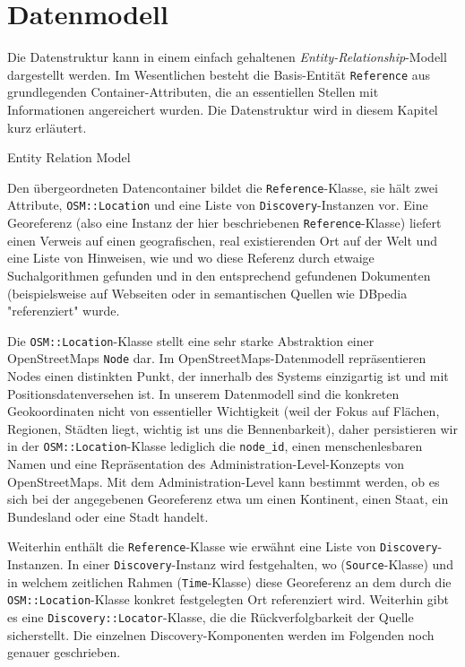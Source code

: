 \section{Datenmodell}
\label{datenmodell}

Die Datenstruktur kann in einem einfach gehaltenen \textit{Entity-Relationship}-Modell dargestellt werden. Im Wesentlichen besteht die Basis-Entität \texttt{Reference} aus grundlegenden Container-Attributen, die an essentiellen Stellen mit Informationen angereichert wurden. Die Datenstruktur wird in diesem Kapitel kurz erläutert.

Entity Relation Model

Den übergeordneten Datencontainer bildet die \texttt{Reference}-Klasse, sie hält zwei Attribute, \texttt{OSM::Location} und eine Liste von \texttt{Discovery}-Instanzen vor. Eine Georeferenz (also eine Instanz der hier beschriebenen  \texttt{Reference}-Klasse) liefert einen Verweis auf einen geografischen, real existierenden Ort auf der Welt und eine Liste von Hinweisen, wie und wo diese Referenz durch etwaige Suchalgorithmen gefunden und in den entsprechend gefundenen Dokumenten (beispielsweise auf Webseiten oder in semantischen Quellen wie DBpedia "referenziert" wurde.

Die \texttt{OSM::Location}-Klasse stellt eine sehr starke Abstraktion einer OpenStreetMaps \texttt{Node}\cite{OSMnode} dar. Im OpenStreetMaps-Datenmodell repräsentieren Nodes einen distinkten Punkt, der innerhalb des Systems einzigartig ist und mit Positionsdatenversehen ist. In unserem Datenmodell sind die konkreten Geokoordinaten nicht von essentieller Wichtigkeit (weil der Fokus auf Flächen, Regionen, Städten liegt, wichtig ist uns die Bennenbarkeit), daher persistieren wir in der \texttt{OSM::Location}-Klasse lediglich die \texttt{node\_id}, einen menschenlesbaren Namen und eine Repräsentation des Administration-Level-Konzepts von OpenStreetMaps\cite{OSMadminlevel}. Mit dem Administration-Level kann bestimmt werden, ob es sich bei der angegebenen Georeferenz etwa um einen Kontinent, einen Staat, ein Bundesland oder eine Stadt handelt.

Weiterhin enthält die \texttt{Reference}-Klasse wie erwähnt eine Liste von \texttt{Discovery}-Instanzen. In einer \texttt{Discovery}-Instanz wird festgehalten, wo (\texttt{Source}-Klasse) und in welchem zeitlichen Rahmen (\texttt{Time}-Klasse) diese Georeferenz an dem durch die \texttt{OSM::Location}-Klasse konkret festgelegten Ort referenziert wird. Weiterhin gibt es eine \texttt{Discovery::Locator}-Klasse, die die Rückverfolgbarkeit der Quelle sicherstellt. Die einzelnen Discovery-Komponenten werden im Folgenden noch genauer geschrieben.

